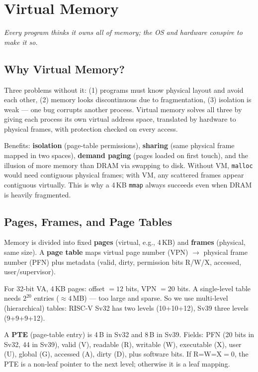 \chapter{Virtual Memory}\label{ch:vm}
\begin{center}\small\textit{Every program thinks it owns all of memory; the OS and hardware conspire to make it so.}\end{center}

\section{Why Virtual Memory?}
Three problems without it: (1) programs must know physical layout and avoid each other, (2) memory looks discontinuous due to fragmentation, (3) isolation is weak --- one bug corrupts another process. Virtual memory solves all three by giving each process its own virtual address space, translated by hardware to physical frames, with protection checked on every access.

Benefits: \textbf{isolation} (page-table permissions), \textbf{sharing} (same physical frame mapped in two spaces), \textbf{demand paging} (pages loaded on first touch), and the illusion of more memory than DRAM via swapping to disk.
Without VM, \texttt{malloc} would need contiguous physical frames; with VM, any scattered frames appear contiguous virtually. This is why a 4\,KB \texttt{mmap} always succeeds even when DRAM is heavily fragmented.

\section{Pages, Frames, and Page Tables}
Memory is divided into fixed \textbf{pages} (virtual, e.g., 4\,KB) and \textbf{frames} (physical, same size). A \textbf{page table} maps virtual page number (VPN) $\to$ physical frame number (PFN) plus metadata (valid, dirty, permission bits R/W/X, accessed, user/supervisor).

For 32-bit VA, 4\,KB pages: offset $=12$ bits, VPN $=20$ bits. A single-level table needs $2^{20}$ entries ($\approx 4$\,MB) --- too large and sparse. So we use multi-level (hierarchical) tables: RISC-V Sv32 has two levels (10+10+12), Sv39 three levels (9+9+9+12).

A \textbf{PTE} (page-table entry) is 4\,B in Sv32 and 8\,B in Sv39. Fields: PFN (20 bits in Sv32, 44 in Sv39), valid (V), readable (R), writable (W), executable (X), user (U), global (G), accessed (A), dirty (D), plus software bits. If R=W=X$=0$, the PTE is a non-leaf pointer to the next level; otherwise it is a leaf mapping.

